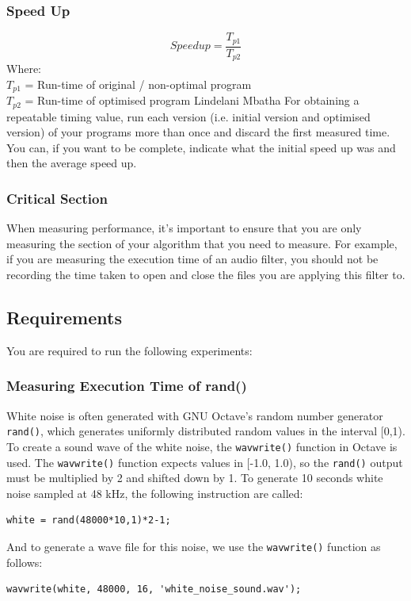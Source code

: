 \subsubsection{Speed Up}
\begin{equation}
Speedup = \frac{T_{p1}}{T_{p2}}
\end{equation}
Where:\\
$T_{p1}$ = Run-time of original / non-optimal program\\
$T_{p2}$ = Run-time of optimised program
Lindelani Mbatha
For obtaining a repeatable timing value, run each version (i.e. initial version and optimised version) of your programs more than once and discard the first measured time. You can, if you want to be complete, indicate what the initial speed up was and then the average speed up.

\subsubsection{Critical Section}
When measuring performance, it's important to ensure that you are only measuring the section of your algorithm that you need to measure. For example, if you are measuring the execution time of an audio filter, you should not be recording the time taken to open and close the files you are applying this filter to.

\subsection{Requirements}
You are required to run the following experiments:
\subsubsection{Measuring Execution Time of rand()}
White noise is often generated with GNU Octave’s random number generator \verb|rand()|, which generates uniformly distributed random values in the interval [0,1). To create a sound wave of the white noise, the \verb|wavwrite()| function in Octave is used. The \verb|wavwrite()| function expects values in [-1.0, 1.0), so the \verb|rand()| output must be multiplied by 2 and shifted down by 1. To generate 10 seconds white noise sampled at 48 kHz, the following instruction are called:
\begin{lstlisting}
white = rand(48000*10,1)*2-1;
\end{lstlisting}
And to generate a wave file for this noise, we use the \verb|wavwrite()| function as follows:
\begin{lstlisting}
wavwrite(white, 48000, 16, 'white_noise_sound.wav');
\end{lstlisting}

